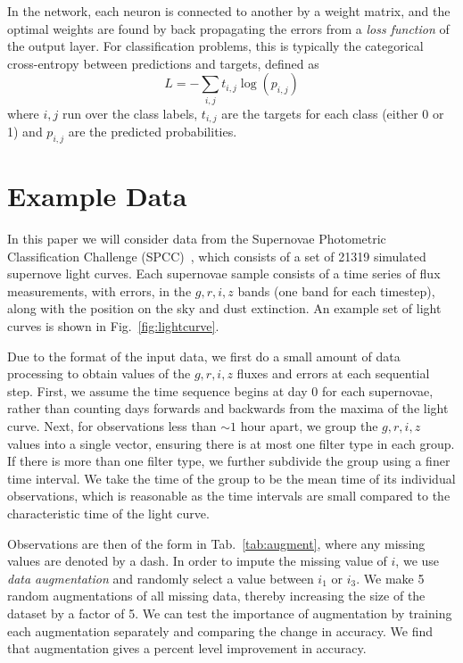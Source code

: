 \documentclass[nofootinbib,amsmath,amssymb,10pt,eqsecnum, twocolumn]{revtex4-1}
\begin{document}
 In the network, each neuron is connected to another by a weight matrix, and the optimal weights are found by back propagating the errors from a {\em loss function} of the output layer. For classification problems, this is typically the categorical cross-entropy between predictions and targets, defined as 
\begin{equation}
L= -\sum_{i,j} t_{i,j} \log \left( p_{i,j} \right)
\end{equation}
where $i,j$ run over the class labels, $t_{i,j}$ are the targets for each class (either 0 or 1) and $p_{i,j}$ are the predicted probabilities. 

\section{Example Data}

In this paper we will consider data from the Supernovae Photometric Classification Challenge (SPCC)~\cite{Kessler:2010wk,Kessler:2010qj}, which consists of a set of 21319 simulated supernove light curves.  Each supernovae sample consists of a time series of flux measurements, with errors, in the $g, r, i, z$ bands (one band for each timestep), along with the position on the sky and dust extinction. An example set of light curves is shown in Fig.~\ref{fig:lightcurve}. 

Due to the format of the input data, we first do a small amount of data processing to obtain values of the $g, r, i, z$ fluxes and errors at each sequential step.  First, we assume the time sequence begins at day 0 for each supernovae, rather than counting days forwards and backwards from the maxima of the light curve. Next, for observations less than $\sim1$ hour apart, we group the $g, r, i, z$ values into a single vector, ensuring there is at most one filter type in each group. If there is more than one filter type, we further subdivide the group using a finer time interval.  We take the time of the group to be the mean time of its individual observations, which is reasonable as the time intervals are small compared to the characteristic time of the light curve. 

 Observations are then of the form in Tab.~\ref{tab:augment}, where any missing values are denoted by a dash. In order to impute the missing value of $i$, we use {\em data augmentation} and randomly select a value between $i_1$ or $i_3$. We make 5 random augmentations of all missing data, thereby increasing the size of the dataset by a factor of 5. We can test the importance of augmentation by training each augmentation separately and  comparing the change in accuracy. We find that augmentation gives a percent level improvement in accuracy.
\end{document}
